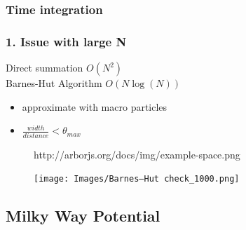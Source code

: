 \documentclass{beamer}
\begin{document}
\subsubsection{Time integration}

\begin{frame}
\frametitle{1. Issue with large N}

Direct summation \(O(N^2)\)
\\[2ex]
Barnes-Hut Algorithm \(O(N\log(N))\)
\begin{itemize}
 \item approximate with macro particles
 \item \(\frac{width}{distance} < \theta_{max}\)
\end{itemize}

\end{frame}

\begin{frame}
\begin{figure}
\centering
{}
                  {http://arborjs.org/docs/img/example-space.png}
\end{figure}
\end{frame}

\begin{frame}
\begin{figure}
\centering
\texttt{[image: Images/Barnes–Hut check\_1000.png]}
\end{figure}
\end{frame}


\subsection{Milky Way Potential}
\end{document}
